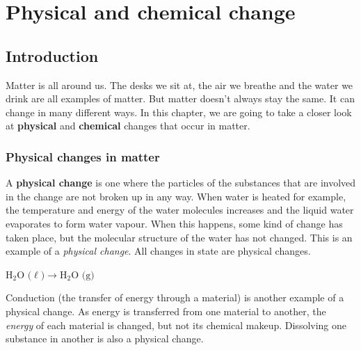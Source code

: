         \chapter{Physical and chemical change}
    \setcounter{figure}{1}
    \setcounter{subfigure}{1}
    \label{m38709*cid1}
            \section{Introduction}
            \nopagebreak
      \label{m38709*id62175}Matter is all around us. The desks we sit at, the air we breathe and the water we drink are all examples of matter. But matter doesn't always stay the same. It can change in many different ways. In this chapter, we are going to take a closer look at \textbf{physical} and \textbf{chemical} changes that occur in matter.\par 
    \label{m38709*cid2}
            \subsection*{Physical changes in matter}
            \nopagebreak
      \label{m38709*id62200}A \textbf{physical change} is one where the particles of the substances that are involved in the change are not broken up in any way. When water is heated for example, the temperature and energy of the water molecules increases and the liquid water evaporates to form water vapour. When this happens, some kind of change has taken place, but the molecular structure of the water has not changed. This is an example of a \textsl{physical change}. All changes in state are physical changes.\par 
      \label{m38709*id62556}$\text{H}_{2}\text{O (}\ell \text{)} \to \text{H}_{2}\text{O (g)}$
      \par 
      \label{m38709*id62600}Conduction (the transfer of energy through a material) is another example of a physical change. As energy is transferred from one material to another, the \textsl{energy} of each material is changed, but not its chemical makeup. Dissolving one substance in another is also a physical change.\par 

